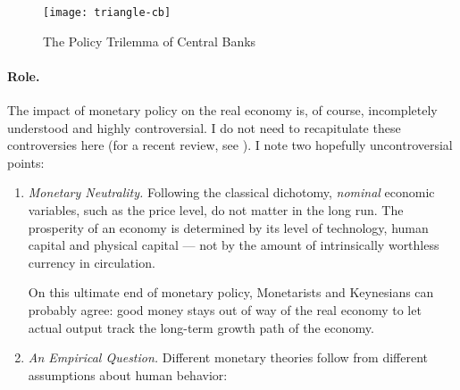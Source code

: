  \begin{figure}[htbp]
	\centering
	\texttt{[image: triangle-cb]}
	\caption{The Policy Trilemma of Central Banks}
	\label{fig:triangle-cb}
\end{figure}

\paragraph[Role]{Role.} %
The impact of monetary policy on the real economy is, of course, incompletely understood and highly controversial.
I do not need to recapitulate these controversies here (for a recent review, see \citealt{Wapshott2011}).
I note two hopefully uncontroversial points:

\begin{enumerate}
	\item \emph{Monetary Neutrality.} \label{itm:monetary-neutrality} Following the classical dichotomy, \emph{nominal} economic variables, such as the price level, do not matter in the long run.
The prosperity of an economy is determined by its level of technology, human capital and physical capital --- not by the amount of intrinsically worthless currency in circulation.

	On this ultimate end of monetary policy, Monetarists and Keynesians can probably agree:
good money stays out of way of the real economy to let actual output track the long-term growth path of the economy.

	\item \label{itm:empirical-macroeconomics} \emph{An Empirical Question.}
	Different monetary theories follow from different assumptions about human behavior:



\end{enumerate}
